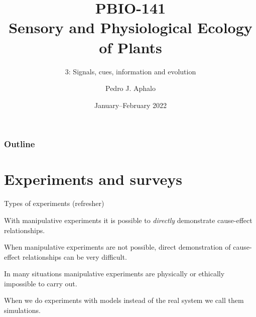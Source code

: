 \documentclass[10pt]{beamer}
\begin{document}
\title{PBIO-141\\Sensory and Physiological Ecology\\ of  Plants}
\subtitle{3: Signals, cues, information and evolution}
\author{Pedro J. Aphalo}
\date{January--February 2022}

  \begin{frame}
    \maketitle
  \end{frame}



  \begin{frame}
    \frametitle{Outline}
    \tableofcontents
  \end{frame}

\section{Experiments and surveys}

\begin{frame}{Types of experiments (refresher)}
\begin{small}
    \begin{description}[type=1]
        \item[Manipulative experiments.] With manipulative experiments it
        is possible to \emph{directly} demonstrate cause-effect relationships.

        \item[Observational experiments.] When manipulative experiments
        are not possible, direct demonstration of cause-effect
        relationships can be very difficult.

        \item[Impossible experiments.] In many situations
        manipulative experiments are physically or ethically
        impossible to carry out.

        \item[Simulations.] When we do experiments with models
        instead of the real system we call them simulations.

        \item[\DExamples]

    \end{description}
\end{small}
\end{frame}
\end{document}

